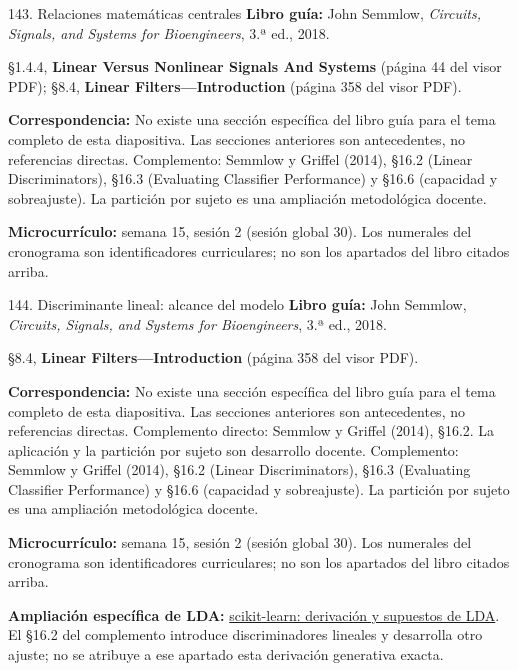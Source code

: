 \documentclass[
  10pt,
  ignorenonframetext,
  aspectratio=169,
  spanish,
]{beamer}
\begin{document}
\begin{frame}{143. Relaciones matemáticas centrales}
\label{relaciones-matemuxe1ticas-centrales-9}
\textbf{Libro guía:} John Semmlow, \emph{Circuits, Signals, and Systems
for Bioengineers}, 3.ª ed., 2018.

§1.4.4, \textbf{Linear Versus Nonlinear Signals And Systems} (página 44
del visor PDF); §8.4, \textbf{Linear Filters---Introduction} (página 358
del visor PDF).

\textbf{Correspondencia:} No existe una sección específica del libro
guía para el tema completo de esta diapositiva. Las secciones anteriores
son antecedentes, no referencias directas. Complemento: Semmlow y
Griffel (2014), §16.2 (Linear Discriminators), §16.3 (Evaluating
Classifier Performance) y §16.6 (capacidad y sobreajuste). La partición
por sujeto es una ampliación metodológica docente.

\textbf{Microcurrículo:} semana 15, sesión 2 (sesión global 30). Los
numerales del cronograma son identificadores curriculares; no son los
apartados del libro citados arriba.
\end{frame}

\begin{frame}{144. Discriminante lineal: alcance del modelo}
\label{discriminante-lineal-alcance-del-modelo}
\textbf{Libro guía:} John Semmlow, \emph{Circuits, Signals, and Systems
for Bioengineers}, 3.ª ed., 2018.

§8.4, \textbf{Linear Filters---Introduction} (página 358 del visor PDF).

\textbf{Correspondencia:} No existe una sección específica del libro
guía para el tema completo de esta diapositiva. Las secciones anteriores
son antecedentes, no referencias directas. Complemento directo: Semmlow
y Griffel (2014), §16.2. La aplicación y la partición por sujeto son
desarrollo docente. Complemento: Semmlow y Griffel (2014), §16.2 (Linear
Discriminators), §16.3 (Evaluating Classifier Performance) y §16.6
(capacidad y sobreajuste). La partición por sujeto es una ampliación
metodológica docente.

\textbf{Microcurrículo:} semana 15, sesión 2 (sesión global 30). Los
numerales del cronograma son identificadores curriculares; no son los
apartados del libro citados arriba.

\textbf{Ampliación específica de LDA:}
\href{https://scikit-learn.org/stable/modules/lda_qda.html}{scikit-learn:
derivación y supuestos de LDA}. El §16.2 del complemento introduce
discriminadores lineales y desarrolla otro ajuste; no se atribuye a ese
apartado esta derivación generativa exacta.
\end{frame}
\end{document}
